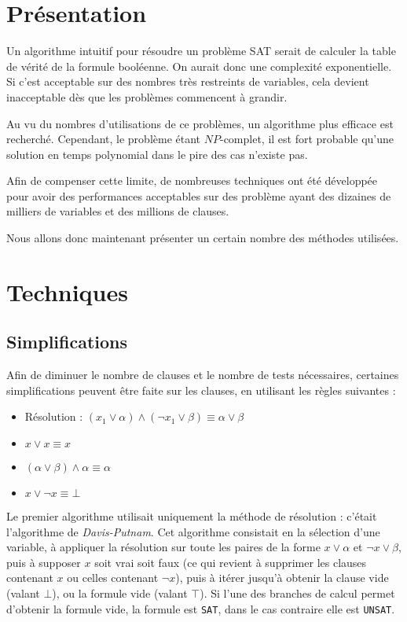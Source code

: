 \section{Présentation}
Un algorithme intuitif pour résoudre un problème SAT serait de calculer la
table de vérité de la formule booléenne. On aurait donc une complexité
exponentielle. Si c'est acceptable sur des nombres très restreints de
variables, cela devient inacceptable dès que les problèmes commencent à
grandir. 

Au vu du nombres d'utilisations de ce problèmes, un algorithme plus efficace
est recherché. Cependant, le problème étant $NP$-complet, il est fort probable
qu'une solution en temps polynomial dans le pire des cas n'existe pas.

Afin de compenser cette limite, de nombreuses techniques ont été développée
pour avoir des performances acceptables  sur des problème ayant des dizaines de milliers de
variables et des millions de clauses.

Nous allons donc maintenant présenter un certain nombre des méthodes utilisées.

\section{Techniques}
\subsection{Simplifications}
Afin de diminuer le nombre de clauses et le nombre de tests nécessaires,
certaines simplifications peuvent être faite sur les clauses, en utilisant les
règles suivantes : \begin{itemize}
    \item Résolution :
           $(x_1\vee\alpha) \wedge (\neg x_1\vee\beta) \equiv \alpha\vee\beta$
    \item $x \vee x \equiv x$
    \item $(\alpha\vee\beta)\wedge\alpha\equiv\alpha$
    \item $x\vee\neg x \equiv \bot$
\end{itemize}

Le premier algorithme utilisait uniquement la méthode de résolution : c'était
l'algorithme de \emph{Davis-Putnam}\cite{dp60}. Cet algorithme
consistait en la sélection d'une variable, à appliquer la résolution sur toute
les paires de la forme $x\vee\alpha$ et $\neg x\vee\beta$, puis à supposer
$x$ soit vrai soit faux (ce qui revient à supprimer les clauses contenant $x$
ou celles contenant $\neg x$), puis à itérer jusqu'à obtenir la clause vide
(valant $\bot$), ou la formule vide (valant $\top$). Si l'une des branches de
calcul permet d'obtenir la formule vide, la formule est \texttt{SAT}, dans le
cas contraire elle est \texttt{UNSAT}.

